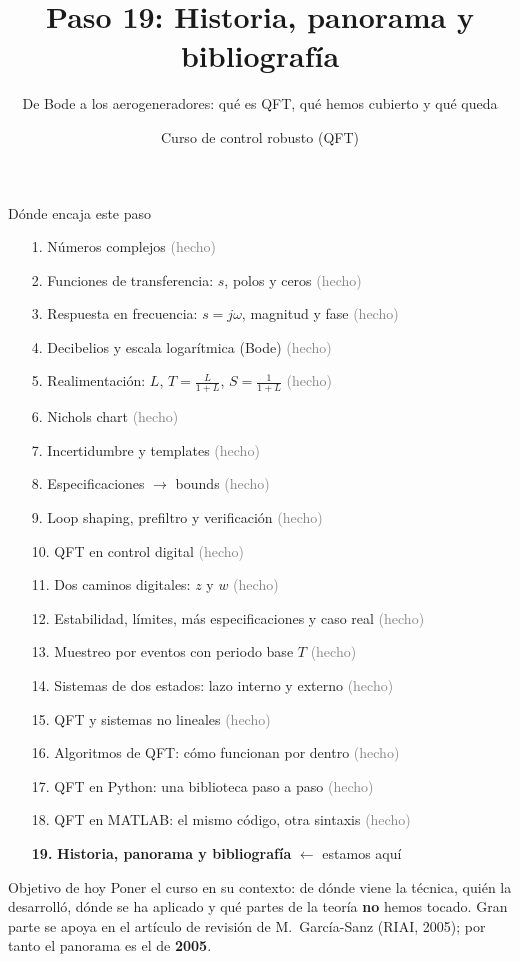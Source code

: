 \documentclass[aspectratio=169,11pt]{beamer}
\title[Historia y panorama]{Paso 19: Historia, panorama y bibliografía}
\subtitle{De Bode a los aerogeneradores: qué es QFT, qué hemos cubierto y qué queda}
\author{Curso de control robusto (QFT)}
\date{}
\begin{document}
\begin{frame}\titlepage\end{frame}

\begin{frame}{Dónde encaja este paso}
  \tiny
  \begin{enumerate}\setlength{\itemsep}{-2pt}
    \item[1.] Números complejos \hfill \textcolor{gray}{(hecho)}
    \item[2.] Funciones de transferencia: $s$, polos y ceros \hfill \textcolor{gray}{(hecho)}
    \item[3.] Respuesta en frecuencia: $s=j\omega$, magnitud y fase \hfill \textcolor{gray}{(hecho)}
    \item[4.] Decibelios y escala logarítmica (Bode) \hfill \textcolor{gray}{(hecho)}
    \item[5.] Realimentación: $L$, $T=\frac{L}{1+L}$, $S=\frac{1}{1+L}$ \hfill \textcolor{gray}{(hecho)}
    \item[6.] Nichols chart \hfill \textcolor{gray}{(hecho)}
    \item[7.] Incertidumbre y templates \hfill \textcolor{gray}{(hecho)}
    \item[8.] Especificaciones $\rightarrow$ bounds \hfill \textcolor{gray}{(hecho)}
    \item[9.] Loop shaping, prefiltro y verificación \hfill \textcolor{gray}{(hecho)}
    \item[10.] QFT en control digital \hfill \textcolor{gray}{(hecho)}
    \item[11.] Dos caminos digitales: $z$ y $w$ \hfill \textcolor{gray}{(hecho)}
    \item[12.] Estabilidad, límites, más especificaciones y caso real \hfill \textcolor{gray}{(hecho)}
    \item[13.] Muestreo por eventos con periodo base $T$ \hfill \textcolor{gray}{(hecho)}
    \item[14.] Sistemas de dos estados: lazo interno y externo \hfill \textcolor{gray}{(hecho)}
    \item[15.] QFT y sistemas no lineales \hfill \textcolor{gray}{(hecho)}
    \item[16.] Algoritmos de QFT: cómo funcionan por dentro \hfill \textcolor{gray}{(hecho)}
    \item[17.] QFT en Python: una biblioteca paso a paso \hfill \textcolor{gray}{(hecho)}
    \item[18.] QFT en MATLAB: el mismo código, otra sintaxis \hfill \textcolor{gray}{(hecho)}
    \item[\textbf{19.}] \textbf{Historia, panorama y bibliografía} \hfill $\leftarrow$ estamos aquí
  \end{enumerate}
  \vspace{2pt}
  \begin{block}{Objetivo de hoy}
    \footnotesize
    Poner el curso en su contexto: de dónde viene la técnica, quién la desarrolló, dónde se ha aplicado y qué partes de la teoría \textbf{no} hemos tocado. Gran parte se apoya en el artículo de revisión de M.~García-Sanz (RIAI, 2005); por tanto el panorama es el de \textbf{2005}.
  \end{block}
\end{frame}
\end{document}
